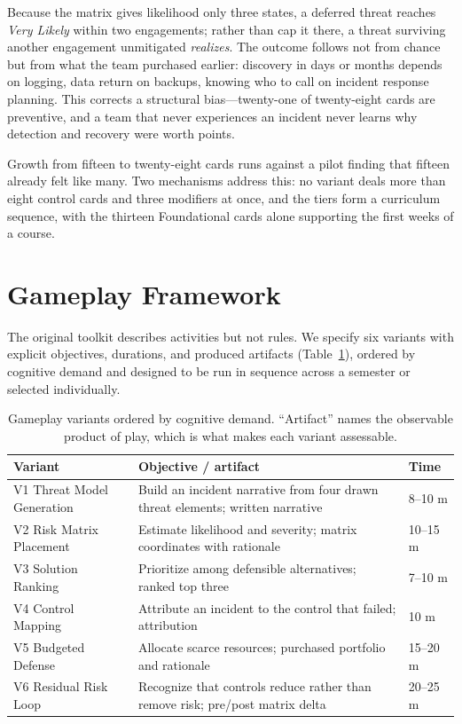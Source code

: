 \documentclass[10pt,twocolumn,letterpaper]{article}
\begin{document}
Because the matrix gives likelihood only three states, a deferred threat reaches
\emph{Very Likely} within two engagements; rather than cap it there, a threat
surviving another engagement unmitigated \emph{realizes}. The outcome follows
not from chance but from what the team purchased earlier: discovery in days or
months depends on logging, data return on backups, knowing who to call on
incident response planning. This corrects a structural bias---twenty-one of
twenty-eight cards are preventive, and a team that never experiences an incident
never learns why detection and recovery were worth points.

Growth from fifteen to twenty-eight cards runs against a pilot finding that
fifteen already felt like many. Two mechanisms address this: no variant deals
more than eight control cards and three modifiers at once, and the tiers form a
curriculum sequence, with the thirteen Foundational cards alone supporting the
first weeks of a course.

\section{Gameplay Framework}
\label{sec:gameplay}

The original toolkit describes activities but not rules. We specify six variants
with explicit objectives, durations, and produced artifacts
(Table~\ref{tab:variants}), ordered by cognitive demand and designed to be run
in sequence across a semester or selected individually.

\begin{table}[h]
\centering
\caption{Gameplay variants ordered by cognitive demand. ``Artifact'' names the
observable product of play, which is what makes each variant assessable.}
\label{tab:variants}
\footnotesize
\begin{tabularx}{\columnwidth}{@{}l X l@{}}
\toprule
\textbf{Variant} & \textbf{Objective / artifact} & \textbf{Time} \\
\midrule
V1 Threat Model Generation & Build an incident narrative from four drawn threat elements; written narrative & 8--10 m \\
V2 Risk Matrix Placement & Estimate likelihood and severity; matrix coordinates with rationale & 10--15 m \\
V3 Solution Ranking & Prioritize among defensible alternatives; ranked top three & 7--10 m \\
V4 Control Mapping & Attribute an incident to the control that failed; attribution & 10 m \\
V5 Budgeted Defense & Allocate scarce resources; purchased portfolio and rationale & 15--20 m \\
V6 Residual Risk Loop & Recognize that controls reduce rather than remove risk; pre/post matrix delta & 20--25 m \\
\bottomrule
\end{tabularx}
\end{table}
\end{document}
